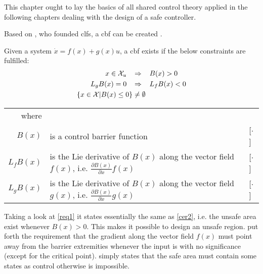 This chapter ought to lay the basics of all shared control theory applied in the following chapters dealing with the design of a safe controller.

Based on \citep{bib:artstein}, who founded \glspl{clf}, a \gls{cbf} can be created \citep{bib:org_control}. 
\begin{exa}
Given a system $\dot{x}=f(x)+g(x)u$, a \gls{cbf} exists if the below constraints are fulfilled:
\begin{subequations}
\begin{flalign}
x\in \mathcal{X}_u \hspace{0.3cm} &\Rightarrow \hspace{0.3cm} B(x) > 0  \label{req1} \\
L_gB(x) = 0 \hspace{0.3cm} &\Rightarrow \hspace{0.3cm} L_fB(x) < 0 \label{req2} \\
\{ x \in \mathcal{X} | B(x) \leq 0 \} &\neq \emptyset \label{req3}
\end{flalign}
\end{subequations}
\vspace{-0.6cm}
\begin{tabular}{r l l} 
where  & & \\
$B(x)$ & is a control barrier function & [$\cdot$] \\ 
$L_fB(x)$ & is the Lie derivative of $B(x)$ along the vector field  $f(x)$, i.e. $\frac{\partial B(x)}{\partial x}f(x)$ & [$\cdot$] \\ 
$L_gB(x)$ & is the Lie derivative of $B(x)$ along the vector field  $g(x)$, i.e. $\frac{\partial B(x)}{\partial x}g(x)$ & [$\cdot$] 
\end{tabular}
\vspace*{0.2cm}
\end{exa}
Taking a look at \autoref{req1} it states essentially the same as \autoref{cer2}, i.e. the unsafe area exist whenever $B(x)>0$. This makes it possible to design an unsafe region.  put forth the requirement that the gradient along the vector field $f(x)$ must point away from the barrier extremities whenever the input is with no significance (except for the critical point).  simply states that the safe area must contain some states as control otherwise is impossible.
%
